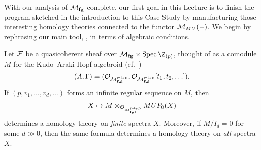 With our analysis of \(\mathcal{M}_{\mathbf{fg}}\) complete, our first goal in this Lecture is to finish the program sketched in the introduction to this Case Study by manufacturing those interesting homology theories connected to the functor \(\mathcal{M}_{MU}(-)\).  We begin by rephrasing our main tool, , in terms of algebraic conditions.
\begin{theorem}
Let \(\mathcal{F}\) be a quasicoherent sheaf over \(\moduli{fg} \times \Spec \Z_{(p)}\), thought of as a comodule \(M\) for the Kudo--Araki Hopf algebroid (cf.\ ) \[(A, \Gamma) = (\mathcal{O}_{\mathcal{M}_{\mathbf{fgl}}^{\mathit{p}\text{-}\mathrm{typ}}}, \mathcal{O}_{\mathcal{M}_{\mathbf{fgl}}^{\mathit{p}\text{-}\mathrm{typ}}}[t_1, t_2, \ldots]).\]  If \((p, v_1, \ldots, v_d, \ldots)\) forms an infinite regular sequence on \(M\), then \[X \mapsto M \otimes_{\mathcal{O}_{\mathcal{M}_{\mathbf{fgl}}^{\mathit{p}\text{-}\mathrm{typ}}}} MUP_0(X)\] determines a homology theory on \emph{finite} spectra \(X\).  Moreover, if \(M/I_d = 0\) for some \(d \gg 0\), then the same formula determines a homology theory on \emph{all} spectra \(X\).
\label{LEFTRealTheoremWithProof}
\end{theorem}
